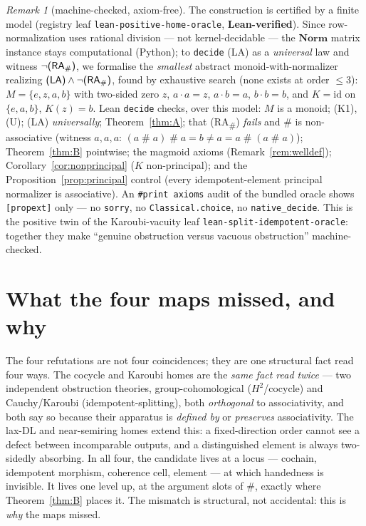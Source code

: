\documentclass[11pt]{amsart}
\theoremstyle{plain}
\theoremstyle{definition}
\theoremstyle{remark}
\newtheorem{remark}[theorem]{Remark}
\newcommand{\Norm}{\mathbf{Norm}}
\newcommand{\sh}{\mathbin{\#}}
\newcommand{\LA}{\textsf{(LA)}}
\newcommand{\RA}{\textsf{(RA}\textsubscript{\#}\textsf{)}}
\begin{document}
\begin{remark}[machine-checked, axiom-free]
\label{rem:lean}
The construction is certified by a finite model (registry leaf \texttt{lean-positive-home-oracle},
\textbf{Lean-verified}). Since row-normalization uses rational division --- not kernel-decidable ---
the $\Norm$ matrix instance stays computational (Python); to \texttt{decide} \LA{} as a
\emph{universal} law and witness $\neg\RA{}$, we formalise the \emph{smallest} abstract
monoid-with-normalizer realizing $\LA\wedge\neg\RA$, found by exhaustive search (none exists at order
$\le 3$): $M=\{e,z,a,b\}$ with two-sided zero $z$, $a\cdot a=z$, $a\cdot b=a$, $b\cdot b=b$, and
$K=\mathrm{id}$ on $\{e,a,b\}$, $K(z)=b$. Lean \texttt{decide} checks, over this model: $M$ is a
monoid; \textsf{(K1)}, \textsf{(U)}; \LA{} \emph{universally}; Theorem~\ref{thm:A}; that \RA{}
\emph{fails} and $\sh$ is non-associative (witness $a,a,a$: $(a\sh a)\sh a=b\ne a=a\sh(a\sh a)$);
Theorem~\ref{thm:B} pointwise; the magmoid axioms (Remark~\ref{rem:welldef});
Corollary~\ref{cor:nonprincipal} ($K$ non-principal); and the Proposition~\ref{prop:principal}
control (every idempotent-element principal normalizer is associative). An \texttt{\#print axioms}
audit of the bundled oracle shows \texttt{[propext]} only --- no \texttt{sorry}, no
\texttt{Classical.choice}, no \texttt{native\_decide}. This is the positive twin of the
Karoubi-vacuity leaf \texttt{lean-split-idempotent-oracle}: together they make ``genuine obstruction
versus vacuous obstruction'' machine-checked.
\end{remark}

\section{What the four maps missed, and why}
\label{sec:missed}

The four refutations are not four coincidences; they are one structural fact read four ways. The
cocycle and Karoubi homes are the \emph{same fact read twice} --- two independent obstruction
theories, group-cohomological ($H^{2}$/cocycle) and Cauchy/Karoubi (idempotent-splitting), both
\emph{orthogonal} to associativity, and both say so because their apparatus is \emph{defined by} or
\emph{preserves} associativity. The lax-DL and near-semiring homes extend this: a fixed-direction
order cannot see a defect between incomparable outputs, and a distinguished element is always
two-sidedly absorbing. In all four, the candidate lives at a locus --- cochain, idempotent morphism,
coherence cell, element --- at which handedness is invisible. It lives one level up, at the argument
slots of $\sh$, exactly where Theorem~\ref{thm:B} places it. The mismatch is structural, not
accidental: this is \emph{why} the maps missed.
\end{document}
